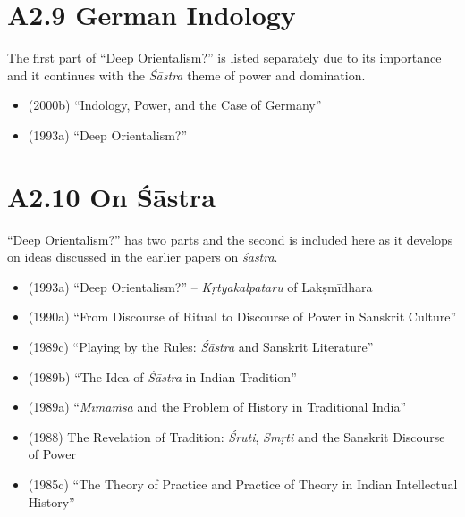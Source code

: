 \section*{A2.9 German Indology}

The first part of “Deep Orientalism?” is listed separately due to its importance and it continues with the \textit{Śāstra} theme of power and domination.

\begin{itemize}
\item (2000b) “Indology, Power, and the Case of Germany”

 \item (1993a) “Deep Orientalism?”

\end{itemize}


\section*{A2.10 On Śāstra}

“Deep Orientalism?” has two parts and the second is included here as it develops on ideas discussed in the earlier papers on \textit{śāstra}.

\begin{itemize}
\item (1993a) “Deep Orientalism?” – \textit{Kṛtyakalpataru} of Lakṣmīdhara

 \item (1990a) “From Discourse of Ritual to Discourse of Power in Sanskrit Culture”

 \item (1989c) “Playing by the Rules: \textit{Śāstra} and Sanskrit Literature”

 \item (1989b) “The Idea of \textit{Śāstra} in Indian Tradition”

 \item (1989a) “\textit{Mīmāṁsā} and the Problem of History in Traditional India”

 \item (1988) The Revelation of Tradition: \textit{Śruti}, \textit{Smṛti} and the Sanskrit Discourse of Power 

 \item (1985c) “The Theory of Practice and Practice of Theory in Indian Intellectual History”

\end{itemize}


